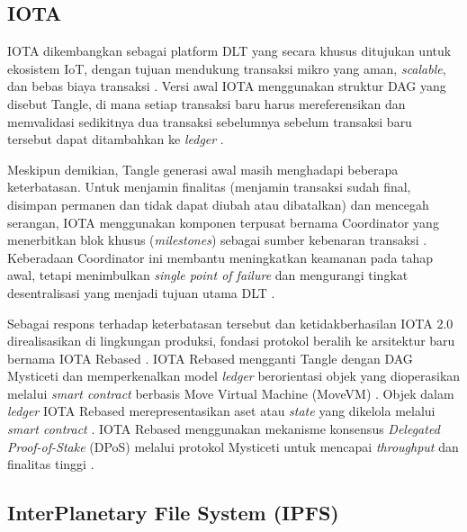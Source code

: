 \subsection{IOTA}

IOTA dikembangkan sebagai platform DLT yang secara khusus ditujukan untuk ekosistem IoT, dengan tujuan mendukung transaksi mikro yang aman, \textit{scalable}, dan bebas biaya transaksi \parencite{FromTangleToRebased_2025}.
Versi awal IOTA menggunakan struktur DAG yang disebut Tangle, di mana setiap transaksi baru harus mereferensikan dan memvalidasi sedikitnya dua transaksi sebelumnya sebelum transaksi baru tersebut dapat ditambahkan ke \textit{ledger} \parencite{TheTangle_Popov_2017,FromTangleToRebased_2025}.

Meskipun demikian, Tangle generasi awal masih menghadapi beberapa keterbatasan.
Untuk menjamin finalitas (menjamin transaksi sudah final, disimpan permanen dan tidak dapat diubah atau dibatalkan) dan mencegah serangan, IOTA menggunakan komponen terpusat bernama Coordinator yang menerbitkan blok khusus (\textit{milestones}) sebagai sumber kebenaran transaksi \parencite{FromTangleToRebased_2025,Anceaume2020_Finality_Blockchain}.
Keberadaan Coordinator ini membantu meningkatkan keamanan pada tahap awal, tetapi menimbulkan \textit{single
point of failure} dan mengurangi tingkat desentralisasi yang menjadi tujuan utama DLT \parencite{FromTangleToRebased_2025}.

Sebagai respons terhadap keterbatasan tersebut dan ketidakberhasilan IOTA 2.0 direalisasikan di lingkungan produksi, fondasi protokol beralih ke arsitektur baru bernama IOTA Rebased \parencite{FromTangleToRebased_2025}.
IOTA Rebased mengganti Tangle dengan DAG Mysticeti dan memperkenalkan model \textit{ledger} berorientasi objek yang dioperasikan melalui \textit{smart contract} berbasis Move Virtual Machine (MoveVM) \parencite{FromTangleToRebased_2025}. 
Objek dalam \textit{ledger} IOTA Rebased merepresentasikan aset atau \textit{state} yang dikelola melalui \textit{smart contract} \parencite{IOTA_Docs_2025}.
IOTA Rebased menggunakan mekanisme konsensus \textit{Delegated Proof-of-Stake} (DPoS) melalui protokol Mysticeti untuk mencapai \textit{throughput} dan finalitas tinggi \parencite{FromTangleToRebased_2025}.

\subsection{InterPlanetary File System (IPFS)}

